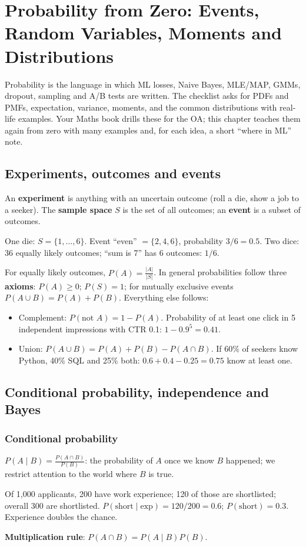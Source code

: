 \chapter{Probability from Zero: Events, Random Variables, Moments and Distributions}

Probability is the language in which ML losses, Naive Bayes, MLE/MAP, GMMs, dropout, sampling and A/B tests are written. The checklist asks for PDFs and
PMFs, expectation, variance, moments, and the common distributions with real-life examples. Your Maths book drills these for the OA; this chapter
teaches them again from zero with many examples and, for each idea, a short ``where in ML'' note.

\section{Experiments, outcomes and events}
An \textbf{experiment} is anything with an uncertain outcome (roll a die, show a job to a seeker). The \textbf{sample space} $S$ is the set of all outcomes; an
\textbf{event} is a subset of outcomes.
\begin{example}
One die: $S = \{1,\dots,6\}$. Event ``even'' $= \{2,4,6\}$, probability $3/6 = 0.5$. Two dice: 36 equally likely outcomes; ``sum is 7'' has 6 outcomes: $1/6$.
\end{example}
For equally likely outcomes, $P(A) = \frac{|A|}{|S|}$. In general probabilities follow three \textbf{axioms}: $P(A)\ge0$; $P(S) = 1$; for mutually exclusive events
$P(A\cup B) = P(A) + P(B)$. Everything else follows:
\begin{itemize}
\item Complement: $P(\text{not }A) = 1 - P(A)$. Probability of at least one click in 5 independent impressions with CTR 0.1: $1 - 0.9^5 = 0.41$.
\item Union: $P(A\cup B) = P(A) + P(B) - P(A\cap B)$. If 60\% of seekers know Python, 40\% SQL and 25\% both: $0.6 + 0.4 - 0.25 = 0.75$ know at least one.
\end{itemize}

\section{Conditional probability, independence and Bayes}
\subsection{Conditional probability}
$P(A\mid B) = \frac{P(A\cap B)}{P(B)}$: the probability of $A$ once we know $B$ happened; we restrict attention to the world where $B$ is true.
\begin{example}[: conditional]
Of 1{,}000 applicants, 200 have work experience; 120 of those are shortlisted; overall 300 are shortlisted. $P(\text{short}\mid\text{exp}) = 120/200 = 0.6$; $P(\text{short}) = 0.3$.
Experience doubles the chance.
\end{example}
\textbf{Multiplication rule}: $P(A\cap B) = P(A\mid B)P(B)$.

